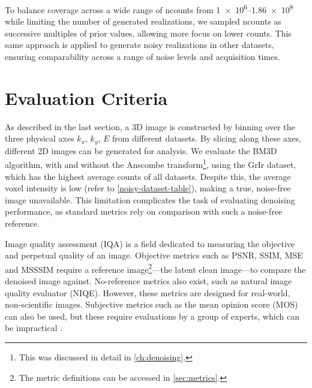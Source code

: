 To balance coverage across a wide range of \gls{ncounts} from \numrange{1e6}{1.86e8} while limiting the number of generated realizations, we sampled \gls{ncounts} as successive multiples of prior values, allowing more focus on lower counts. This same approach is applied to generate noisy realizations in other datasets, ensuring comparability across a range of noise levels and acquisition times.

\section{Evaluation Criteria}
As described in the last section, a 3D image is constructed by binning over the three physical axes $k_x$, $k_y$, $E$ from different datasets. By slicing along these axes, different 2D images can be generated for analysis. We evaluate the \gls{BM3D} algorithm, with and without the Anscombe transform\footnote{This was discussed in detail in \cref{ch:denoising}.}, using the \gls{GrIr} dataset, which has the highest average counts of all datasets. Despite this, the average voxel intensity is low (refer to \cref{noisy-dataset-table}), making a true, noise-free image unavailable. This limitation complicates the task of evaluating denoising performance, as standard metrics rely on comparison with such a noise-free reference.

Image quality assessment (IQA) is a field dedicated to measuring the objective and perpetual quality of an image. Objective metrics such as \gls{PSNR}, \gls{SSIM}, \gls{MSE} and \gls{MSSSIM} require a reference image\footnote{The metric definitions can be accessed in \cref{sec:metrics}.}---the latent clean image---to compare the denoised image against. No-reference metrics also exist, such as natural image quality evaluator (NIQE). However, these metrics are designed for real-world, non-scientific images. Subjective metrics such as the mean opinion score (MOS) can also be used, but these require evaluations by a group of experts, which can be impractical \cite{eskiciogluImageQualityMeasures1995,linzhangFSIMFeatureSimilarity2011}.

